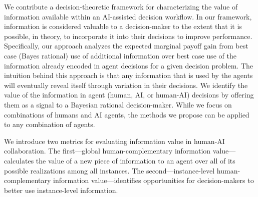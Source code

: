 We contribute a decision-theoretic framework for characterizing the value of information available within an AI-assisted decision workflow.
In our framework, information is considered valuable to a decision-maker to the extent that it is possible, in theory, to incorporate it into their decisions to improve performance. 
Specifically, our approach analyzes the expected marginal payoff gain from best case (Bayes rational) use of additional information over best case use of the information already encoded in agent decisions for a given decision problem. %
The intuition behind this approach is that any information that is used by the agents will eventually reveal itself through variation in their decisions. 
We identify the value of the information in agent (human, AI, or human-AI) decisions by offering them as a signal to a Bayesian rational decision-maker. While we focus on combinations of humans and AI agents, the methods we propose can be applied to any combination of agents.




We introduce two metrics for evaluating information value in human-AI collaboration.
The first---global human-complementary information value---calculates the value of a new piece of information to an agent over all of its possible realizations among all instances.
The second---instance-level human-complementary information value---identifies opportunities for decision-makers to better use instance-level information.

